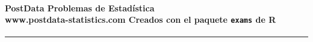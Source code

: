 \documentclass[10pt,a4paper]{article}
\begin{document}
\thispagestyle{empty}

\paragraph{
PostData
\hspace{6.4cm}
Problemas de Estadística
\\[2mm]
www.postdata-statistics.com
\hspace{1.5cm}
Creados con el paquete {\tt exams} de R}
\noindent\hrule
\vspace{0.5cm}


\begin{enumerate}


\end{enumerate}
\end{document}
